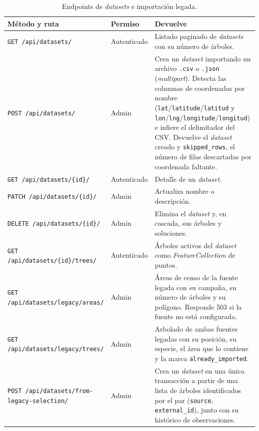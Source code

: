 \begin{table}[H]
  \centering
  \caption{Endpoints de \textit{datasets} e importación legada.}
  \label{tab:anexo_api_datasets}
  \small
  \begin{tabularx}{\textwidth}{@{}p{5.5cm} p{1.9cm} X@{}}
    \toprule
    Método y ruta & Permiso & Devuelve \\
    \midrule
    \texttt{GET \slash api\slash datasets\slash }                       & Autenticado & Listado paginado de \textit{datasets} con su número de árboles. \\
    \texttt{POST \slash api\slash datasets\slash }                      & Admin       & Crea un \textit{dataset} importando un archivo \texttt{.csv} o \texttt{.json} (\textit{multipart}). Detecta las columnas de coordenadas por nombre (\texttt{lat}/\texttt{latitude}/\texttt{latitud} y \texttt{lon}/\texttt{lng}/\texttt{longitude}/\texttt{longitud}) e infiere el delimitador del CSV. Devuelve el \textit{dataset} creado y \texttt{skipped\_rows}, el número de filas descartadas por coordenada faltante. \\
    \texttt{GET \slash api\slash datasets\slash \{id\}\slash }                & Autenticado & Detalle de un \textit{dataset}. \\
    \texttt{PATCH \slash api\slash datasets\slash \{id\}\slash }              & Admin       & Actualiza nombre o descripción. \\
    \texttt{DELETE \slash api\slash datasets\slash \{id\}\slash }             & Admin       & Elimina el \textit{dataset} y, en cascada, sus árboles y soluciones. \\
    \texttt{GET \slash api\slash datasets\slash \{id\}\slash trees\slash }          & Autenticado & Árboles activos del \textit{dataset} como \textit{FeatureCollection} de puntos. \\
    \texttt{GET \slash api\slash datasets\slash legacy\slash areas\slash }          & Admin       & Áreas de censo de la fuente legada con su campaña, su número de árboles y su polígono. Responde 503 si la fuente no está configurada. \\
    \texttt{GET \slash api\slash datasets\slash legacy\slash trees\slash }          & Admin       & Arbolado de ambas fuentes legadas con su posición, su especie, el área que lo contiene y la marca \texttt{already\_imported}. \\
    \texttt{POST \slash api\slash datasets\slash from-legacy-selection\slash } & Admin      & Crea un \textit{dataset} en una única transacción a partir de una lista de árboles identificados por el par (\texttt{source}, \texttt{external\_id}), junto con su histórico de observaciones. \\

\end{tabularx}
\end{table}
